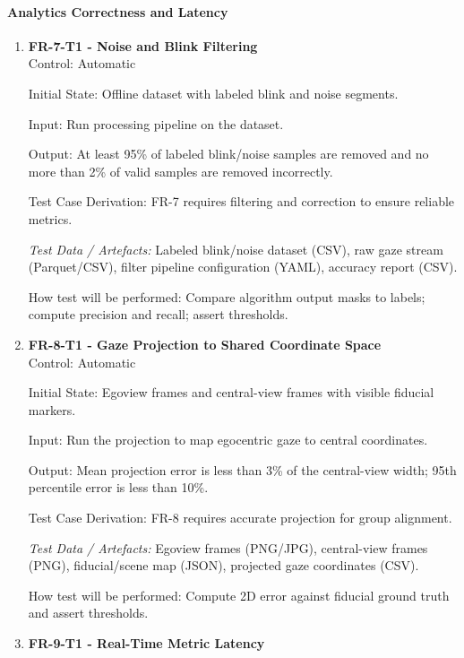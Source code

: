 \documentclass[12pt, titlepage]{article}
\begin{document}
\paragraph{Analytics Correctness and Latency}

\begin{enumerate}

\item \textbf{FR-7-T1 - Noise and Blink Filtering} \\

Control: Automatic

Initial State: Offline dataset with labeled blink and noise segments.

Input: Run processing pipeline on the dataset.

Output: At least 95\% of labeled blink/noise samples are removed and no more than 2\% of valid samples are removed incorrectly.

Test Case Derivation: FR-7 requires filtering and correction to ensure reliable metrics.

\textit{Test Data / Artefacts:} Labeled blink/noise dataset (CSV), raw gaze stream (Parquet/CSV), filter pipeline configuration (YAML), accuracy report (CSV).

How test will be performed: Compare algorithm output masks to labels; compute precision and recall; assert thresholds.

\item \textbf{FR-8-T1 - Gaze Projection to Shared Coordinate Space} \\

Control: Automatic

Initial State: Egoview frames and central-view frames with visible fiducial markers.

Input: Run the projection to map egocentric gaze to central coordinates.

Output: Mean projection error is less than 3\% of the central-view width; 95th percentile error is less than 10\%.

Test Case Derivation: FR-8 requires accurate projection for group alignment.

\textit{Test Data / Artefacts:} Egoview frames (PNG/JPG), central-view frames (PNG), fiducial/scene map (JSON), projected gaze coordinates (CSV).

How test will be performed: Compute 2D error against fiducial ground truth and assert thresholds.

\item \textbf{FR-9-T1 - Real-Time Metric Latency} \\


\end{enumerate}
\end{document}

